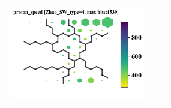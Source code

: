 \documentclass[border=0pt,varwidth=14cm,convert={outext=.jpg,density=300}]{standalone}%
\begin{document}
\begin{figure}[h!]
\begin{tabular}{m{1cm}CC}
		\includegraphics[width=6cm]{Amaya/SWtype-Zhao_SW_type-4-proton_speed}\hfill \\
	\end{tabular}
\end{figure}
\end{document}
